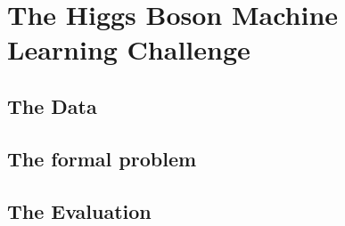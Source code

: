 \section{The Higgs Boson Machine Learning Challenge}\raggedbottom
\subsection{The Data}
\subsection{The formal problem}
\subsection{The Evaluation}
\pagebreak

	{\pagebreak \thispagestyle{empty} \cleardoublepage}{\clearpage}